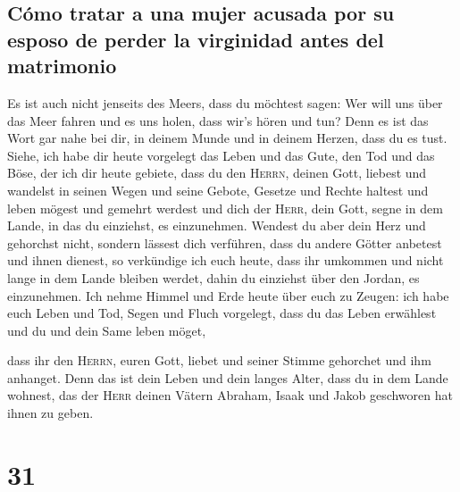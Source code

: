 \hypertarget{cuxf3mo-tratar-a-una-mujer-acusada-por-su-esposo-de-perder-la-virginidad-antes-del-matrimonio}{%
\subsection{Cómo tratar a una mujer acusada por su esposo de perder la
virginidad antes del
matrimonio}\label{cuxf3mo-tratar-a-una-mujer-acusada-por-su-esposo-de-perder-la-virginidad-antes-del-matrimonio}}

 Es ist auch nicht jenseits des Meers, dass du möchtest
sagen: Wer will uns über das Meer fahren und es uns holen, dass wir's
hören und tun?  Denn es ist das Wort gar nahe bei dir, in
deinem Munde und in deinem Herzen, dass du es tust. 
Siehe, ich habe dir heute vorgelegt das Leben und das Gute, den Tod und
das Böse,  der ich dir heute gebiete, dass du den
\textsc{Herrn}, deinen Gott, liebest und wandelst in seinen Wegen und
seine Gebote, Gesetze und Rechte haltest und leben mögest und gemehrt
werdest und dich der \textsc{Herr}, dein Gott, segne in dem Lande, in
das du einziehst, es einzunehmen.  Wendest du aber dein
Herz und gehorchst nicht, sondern lässest dich verführen, dass du andere
Götter anbetest und ihnen dienest,  so verkündige ich
euch heute, dass ihr umkommen und nicht lange in dem Lande bleiben
werdet, dahin du einziehst über den Jordan, es einzunehmen.
 Ich nehme Himmel und Erde heute über euch zu Zeugen: ich
habe euch Leben und Tod, Segen und Fluch vorgelegt, dass du das Leben
erwählest und du und dein Same leben möget,

 dass ihr den \textsc{Herrn}, euren Gott, liebet und
seiner Stimme gehorchet und ihm anhanget. Denn das ist dein Leben und
dein langes Alter, dass du in dem Lande wohnest, das der \textsc{Herr}
deinen Vätern Abraham, Isaak und Jakob geschworen hat ihnen zu geben.

\hypertarget{section-30}{%
\section{31}\label{section-30}}

